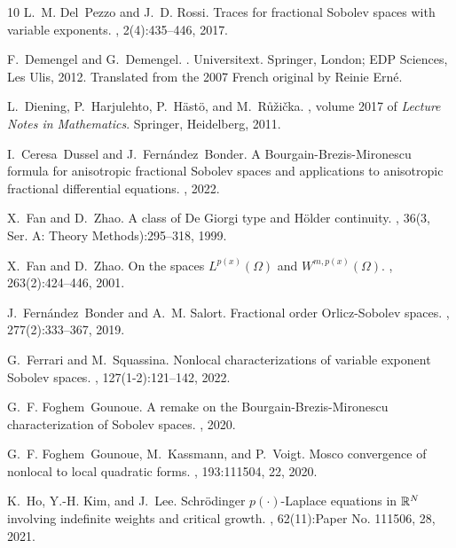 \documentclass[11pt]{amsart}
\theoremstyle{plain}
\theoremstyle{definition}
\numberwithin{equation}{section}
\begin{document}
\begin{thebibliography}{10}
L.~M. Del~Pezzo and J.~D. Rossi.
\newblock Traces for fractional {S}obolev spaces with variable exponents.
, 2(4):435--446, 2017.

F.~Demengel and G.~Demengel.
.
\newblock Universitext. Springer, London; EDP Sciences, Les Ulis, 2012.
\newblock Translated from the 2007 French original by Reinie Ern\'{e}.

L.~Diening, P.~Harjulehto, P.~H\"{a}st\"{o}, and M.~R{\r u}\v{z}i\v{c}ka.
, volume
  2017 of {\em Lecture Notes in Mathematics}.
\newblock Springer, Heidelberg, 2011.

I.~Ceresa~Dussel and J.~Fern\'{a}ndez~Bonder.
\newblock A {B}ourgain-{B}rezis-{M}ironescu formula for anisotropic fractional
  {S}obolev spaces and applications to anisotropic fractional differential
  equations.
, 2022.

X.~Fan and D.~Zhao.
\newblock A class of {D}e {G}iorgi type and {H}\"{o}lder continuity.
, 36(3, Ser. A: Theory Methods):295--318, 1999.

X.~Fan and D.~Zhao.
\newblock On the spaces {$L^{p(x)}(\Omega)$} and {$W^{m,p(x)}(\Omega)$}.
, 263(2):424--446, 2001.

J.~Fern\'{a}ndez~Bonder and A.~M. Salort.
\newblock Fractional order {O}rlicz-{S}obolev spaces.
, 277(2):333--367, 2019.

G.~Ferrari and M.~Squassina.
\newblock Nonlocal characterizations of variable exponent {S}obolev spaces.
, 127(1-2):121--142, 2022.

G.~F. Foghem~Gounoue.
\newblock A remake on the {B}ourgain-{B}rezis-{M}ironescu characterization of {S}obolev
  spaces.
, 2020.

G.~F. Foghem~Gounoue, M.~Kassmann, and P.~Voigt.
\newblock Mosco convergence of nonlocal to local quadratic forms.
, 193:111504, 22, 2020.

K.~Ho, Y.-H. Kim, and J.~Lee.
\newblock Schr\"{o}dinger {$p(\cdot)$}-{L}aplace equations in {$\Bbb R^N$}
  involving indefinite weights and critical growth.
, 62(11):Paper No. 111506, 28, 2021.


\end{thebibliography}
\end{document}
